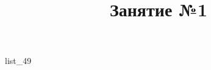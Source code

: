 \documentclass[12pt, a4paper]{article}
\begin{document}
	\title{Занятие №1}
	{list_49}
\end{document}
